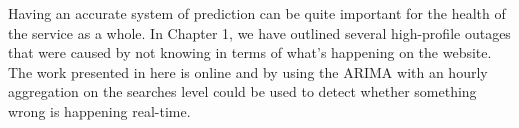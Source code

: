 \documentclass[minf,twoside,singlespacing,parskip,frontabs,notimes,12pt]{infthesis} %
\begin{document}
Having an accurate system of prediction can be quite important for the health of the service as a whole. In Chapter 1, we have outlined several high-profile outages that were caused by not knowing in terms of what's happening on the website. The work presented in here is online and by using the ARIMA with an hourly aggregation on the searches level could be used to detect whether something wrong is happening real-time. 

\raggedright
\sloppy


\end{document}

